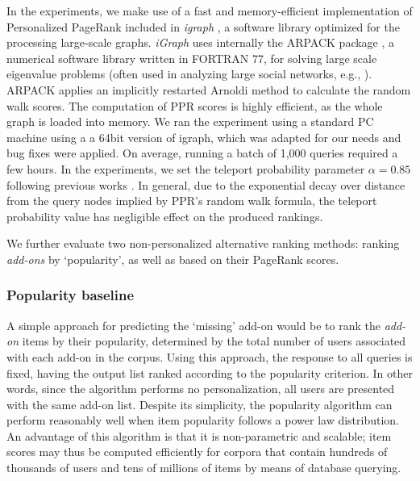 \documentclass[11pt,oneside]{book}
\let\Oldsubsubsection\subsubsection
\renewcommand{\subsubsection}{\FloatBarrier\Oldsubsubsection}
\begin{document}
In the experiments, we make use of a fast and memory-efficient implementation of Personalized PageRank included in {\it igraph} \citep{igraph}, a software library optimized for the processing large-scale graphs. {\it iGraph} uses internally the ARPACK package \citep{lehoucq1998arpack}, a numerical software library written in FORTRAN 77, for solving large scale eigenvalue problems (often used in analyzing large social networks, e.g., \citep{ting2004minig}). ARPACK applies an implicitly restarted Arnoldi method to calculate the random walk scores. The computation of PPR scores is highly efficient, as the whole graph is loaded into memory. We ran the experiment using a standard PC machine using a a 64bit version of igraph, which was adapted for our needs and bug fixes were applied. On average, running a batch of 1,000 queries required a few hours. In the experiments, we set the teleport probability parameter $\alpha=0.85$ following previous works \citep{boldi2005totalrank}. In general, due to the exponential decay over distance from the query nodes implied by PPR's random walk formula, the teleport probability value has negligible effect on the produced rankings.

We further evaluate two non-personalized alternative ranking methods: ranking {\it add-ons} by `popularity', as well as based on their PageRank scores. 

\subsubsection{Popularity baseline} 

A simple approach for predicting the `missing' add-on would be to rank the {\it add-on} items by their popularity, determined by the total number of users associated with each add-on in the corpus. Using this approach, the response to all queries is fixed, having the output list ranked according to the popularity criterion. In other words, since the algorithm performs no personalization, all users are presented with the same
add-on list. Despite its simplicity, the popularity algorithm can perform reasonably well when item popularity follows a power law distribution. An advantage of this algorithm is that it is non-parametric and scalable; item scores may thus be computed efficiently for corpora that contain hundreds of thousands of users and tens of millions of items by means of database querying. 
\end{document}
